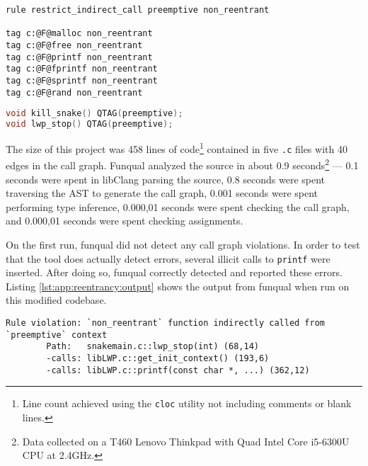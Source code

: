 \noindent\begin{minipage}[t]{\linewidth}
\begin{lstlisting}[caption={Rules file for preventing preemptive functions from calling non\_reentrant functions.  Since this rules file contains no references to project-specific functions, the file could conceivably be re-used by several projects.},label={lst:app:reentrancy:rules}]
rule restrict_indirect_call preemptive non_reentrant

tag c:@F@malloc non_reentrant
tag c:@F@free non_reentrant
tag c:@F@printf non_reentrant
tag c:@F@fprintf non_reentrant
tag c:@F@sprintf non_reentrant
tag c:@F@rand non_reentrant
\end{lstlisting}
\end{minipage}

\noindent\begin{minipage}[t]{\linewidth}
\begin{lstlisting}[language=c,caption={Lines inserted into C file to mark signal handlers as preemptive.},label={lst:app:reentrancy:handlers}]
void kill_snake() QTAG(preemptive);
void lwp_stop() QTAG(preemptive);
\end{lstlisting}
\end{minipage}

The size of this project was 458 lines of code\footnote{Line count achieved using the \lstinline{cloc} utility not including comments or blank lines.} contained in five \lstinline{.c} files with 40 edges in the call graph.  Funqual analyzed the source in about 0.9 seconds\footnote{Data collected on a T460 Lenovo Thinkpad with Quad Intel Core i5-6300U CPU at 2.4GHz.} --- 0.1 seconds were spent in libClang parsing the source, 0.8 seconds were spent traversing the AST to generate the call graph, 0.001 seconds were spent performing type inference, 0.000,01 seconds were spent checking the call graph, and 0.000,01 seconds were spent checking assignments. 

On the first run, funqual did not detect any call graph violations.  In order to test that the tool does actually detect errors, several illicit calls to \lstinline{printf} were inserted.  After doing so, funqual correctly detected and reported these errors.  Listing \ref{lst:app:reentrancy:output} shows the output from funqual when run on this modified codebase.

\noindent\begin{minipage}[t]{\linewidth}
\begin{lstlisting}[caption={Output from funqual when run on a project that had manually-inserted call graph violations},label={lst:app:reentrancy:output}]
Rule violation: `non_reentrant` function indirectly called from `preemptive` context
        Path:   snakemain.c::lwp_stop(int) (68,14)
        -calls: libLWP.c::get_init_context() (193,6)
        -calls: libLWP.c::printf(const char *, ...) (362,12)
\end{lstlisting}
\end{minipage}

